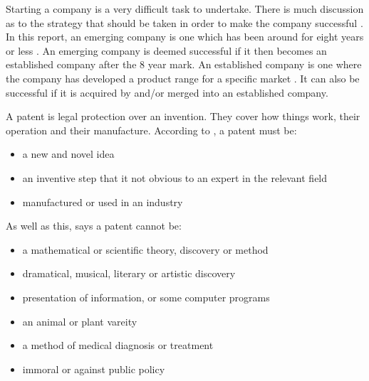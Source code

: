 {}


Starting a company is a very difficult task to undertake. 
There is much discussion as to the strategy that should be taken in order to make the company successful \cite{}.
In this report, an emerging company is one which has been around for eight years or less \cite{zahra1996technology}. 
An emerging company is deemed successful if it then becomes an established company after the 8 year mark.
An established company is one where the company has developed a product range for a specific market \cite{kekale2007successful}.
It can also be successful if it is acquired by and/or merged into an established company. 

A patent is legal protection over an invention.
They cover how things work, their operation and their manufacture. 
According to \cite{ipopatent}, a patent must be:
\begin{itemize}
\item a new and novel idea
\item an inventive step that it not obvious to an expert in the relevant field
\item manufactured or used in an industry
\end{itemize}

As well as this, \cite{ipopatent} says a patent cannot be:
\begin{itemize}
\item a mathematical or scientific theory, discovery or method
\item dramatical, musical, literary or artistic discovery
\item presentation of information, or some computer programs
\item an animal or plant vareity
\item a method of medical diagnosis or treatment
\item immoral or against public policy
\end{itemize}

